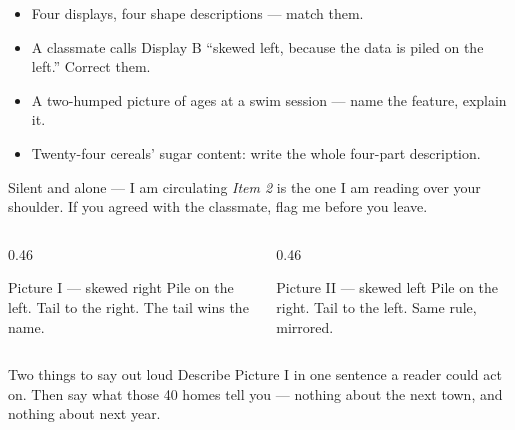 \documentclass[aspectratio=169, 11pt]{beamer}
\begin{document}
\begin{frame}[t, plain]
  \begin{itemize}\setlength{\itemsep}{7pt}
    \item Four displays, four shape descriptions --- match them.
    \item A classmate calls Display B ``skewed left, because the data is piled on the left.''
          Correct them.
    \item A two-humped picture of ages at a swim session --- name the feature, explain it.
    \item Twenty-four cereals' sugar content: write the whole four-part description.
  \end{itemize}
  \begin{block}{Silent and alone --- I am circulating}
    \emph{Item 2} is the one I am reading over your shoulder. If you agreed with the classmate,
    flag me before you leave.
  \end{block}
\end{frame}

\begin{frame}[t, plain]
  \vspace{6pt}
  \begin{columns}[t]
    \begin{column}{0.46\textwidth}
      \begin{block}{Picture I --- skewed right}
        Pile on the left. Tail to the right. The tail wins the name.
      \end{block}
    \end{column}
    \begin{column}{0.46\textwidth}
      \begin{block}{Picture II --- skewed left}
        Pile on the right. Tail to the left. Same rule, mirrored.
      \end{block}
    \end{column}
  \end{columns}
  \vspace{14pt}
  \begin{block}{Two things to say out loud}
    Describe Picture I in one sentence a reader could act on. Then say what those 40 homes
     tell you --- nothing about the next town, and nothing about next year.
  \end{block}
\end{frame}
\end{document}
